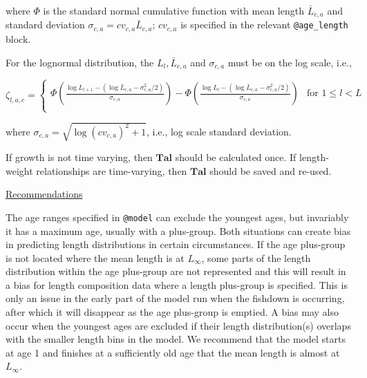 \documentclass[a4paper,11pt,twoside,pdftex,draft]{article}
\begin{document}
where $\Phi$ is the standard normal cumulative function with mean length $\bar L_{c,a}$ and standard deviation $\sigma_{c,a} = cv_{c,a} \bar L_{c,a}$; $cv_{c,a}$ is specified in the relevant  \texttt{@age\_length} block.

For the lognormal distribution, the $L_{l}, \bar L_{c,a}$ and $\sigma_{c,a}$ must be on the log scale, i.e.,

\begin{equation}
\zeta_{l,a,c} =
\begin{cases}

\Phi\left( \frac{\log L_{l+1} - \left( \log\bar L_{c,a}  - \sigma_{c,a}^2/2 \right)}{\sigma_{c,a}} \right) - \Phi\left( \frac{\log L_{l} - \left( \log\bar L_{c,a}  - \sigma_{c,a}^2/2 \right)}{\sigma_{c,a}} \right) & \text{for } 1 \leq l < L \\

\end{cases}
\end{equation}

where $\sigma_{c,a} = \sqrt{\log(cv_{c,a})^2 + 1}$, i.e., log scale standard deviation.

If growth is not time varying, then $\mathbf{Tal}$ should be calculated once. If length-weight relationships are time-varying, then $\mathbf{Tal}$ should be saved and re-used.

\bigskip
\underline{Recommendations}

The age ranges specified in \texttt{@model} can exclude the youngest ages, but invariably it has a maximum age, usually with a plus-group. Both situations can create bias in predicting length distributions in certain circumstances.  If the age plus-group is not located where the mean length is at $L_{\infty}$, some parts of the length distribution within the age plus-group are not represented and this will result in a bias for length composition data where a length plus-group is specified. This is only an issue in the early part of the model run when the fishdown is occurring, after which it will disappear as the age plus-group is emptied.  A bias may also occur when the youngest ages are excluded if their length distribution(s) overlaps with the smaller length bins in the model. We recommend that the model starts at age 1 and finishes at a sufficiently old age that the mean length is almost at $L_{\infty}$. 
\end{document}
